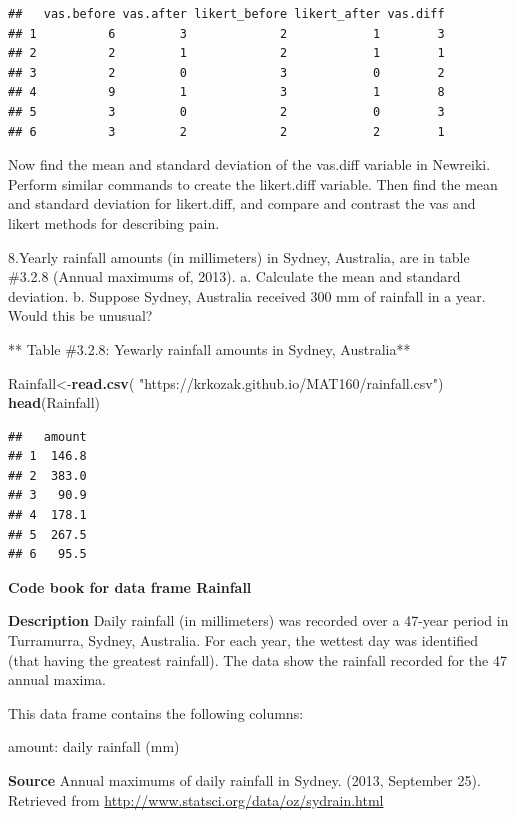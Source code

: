 \documentclass[
]{book}
\newenvironment{Shaded}{\begin{snugshade}}{\end{snugshade}}
\newcommand{\KeywordTok}[1]{\textcolor[rgb]{0.13,0.29,0.53}{\textbf{#1}}}
\newcommand{\NormalTok}[1]{#1}
\newcommand{\StringTok}[1]{\textcolor[rgb]{0.31,0.60,0.02}{#1}}
\begin{document}
\begin{verbatim}
##   vas.before vas.after likert_before likert_after vas.diff
## 1          6         3             2            1        3
## 2          2         1             2            1        1
## 3          2         0             3            0        2
## 4          9         1             3            1        8
## 5          3         0             2            0        3
## 6          3         2             2            2        1
\end{verbatim}

Now find the mean and standard deviation of the vas.diff variable in Newreiki. Perform similar commands to create the likert.diff variable. Then find the mean and standard deviation for likert.diff, and compare and contrast the vas and likert methods for describing pain.

8.Yearly rainfall amounts (in millimeters) in Sydney, Australia, are in table \#3.2.8
(Annual maximums of, 2013).
a. Calculate the mean and standard deviation.
b. Suppose Sydney, Australia received 300 mm of rainfall in a year. Would this be unusual?

** Table \#3.2.8: Yewarly rainfall amounts in Sydney, Australia**

\begin{Shaded}
\begin{Highlighting}[]
\NormalTok{Rainfall<-}\KeywordTok{read.csv}\NormalTok{(}
  \StringTok{"https://krkozak.github.io/MAT160/rainfall.csv"}\NormalTok{)}
\KeywordTok{head}\NormalTok{(Rainfall)}
\end{Highlighting}
\end{Shaded}

\begin{verbatim}
##   amount
## 1  146.8
## 2  383.0
## 3   90.9
## 4  178.1
## 5  267.5
## 6   95.5
\end{verbatim}

\textbf{Code book for data frame Rainfall}

\textbf{Description}
Daily rainfall (in millimeters) was recorded over a 47-year period in Turramurra, Sydney, Australia. For each year, the wettest day was identified (that having the greatest rainfall). The data show the rainfall recorded for the 47 annual maxima.

This data frame contains the following columns:

amount: daily rainfall (mm)

\textbf{Source}
Annual maximums of daily rainfall in Sydney. (2013, September 25). Retrieved from
\url{http://www.statsci.org/data/oz/sydrain.html}
\end{document}
